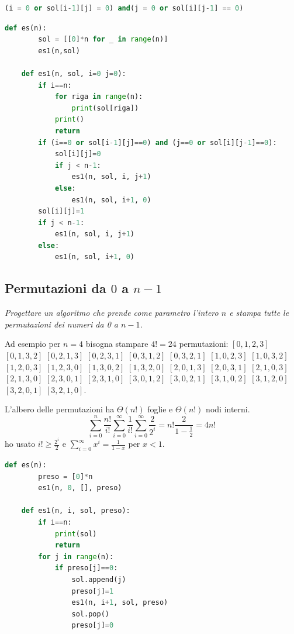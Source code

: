 \begin{lstlisting}[language=Python]
    (i = 0 or sol[i-1][j] = 0) and(j = 0 or sol[i][j-1] == 0)    
\end{lstlisting}

\begin{lstlisting}[language=Python]
    def es(n): 
        sol = [[0]*n for _ in range(n)]
        es1(n,sol)

    def es1(n, sol, i=0 j=0):
        if i==n:
            for riga in range(n):
                print(sol[riga])
            print() 
            return 
        if (i==0 or sol[i-1][j]==0) and (j==0 or sol[i][j-1]==0):
            sol[i][j]=0
            if j < n-1:
                es1(n, sol, i, j+1)
            else: 
                es1(n, sol, i+1, 0) 
        sol[i][j]=1 
        if j < n-1:
            es1(n, sol, i, j+1)
        else:
            es1(n, sol, i+1, 0)
\end{lstlisting}

\subsection{Permutazioni da $0$ a $n-1$}
\textit{Progettare un algoritmo che prende come parametro l'intero $n$ e stampa tutte le permutazioni dei numeri da 0 a $n-1$.}

Ad esempio per $n = 4$ bisogna stampare $4! = 24$ permutazioni: $[0,1,2,3]$ $[0,1,3,2]$ $[0,2,1,3]$ $[0,2,3,1]$ $[0,3,1,2]$ $[0,3,2,1]$ $[1,0,2,3]$ $[1,0,3,2]$ $[1,2,0,3]$ $[1,2,3,0]$ $[1,3,0,2]$ $[1,3,2,0]$ $[2,0,1,3]$ $[2,0,3,1]$ $[2,1,0,3]$ $[2,1,3,0]$ $[2,3,0,1]$ $[2,3,1,0]$ $[3,0,1,2]$ $[3,0,2,1]$ $[3,1,0,2]$ $[3,1,2,0]$ $[3,2,0,1]$ $[3,2,1,0]$.

L’albero delle permutazioni ha $\Theta(n!)$ foglie e $\Theta(n!)$ nodi interni.
\begin{equation*}
    \sum^n_{i=0}\frac{n!}{i!}\sum^\infty_{i=0}\frac{1}{i!}\sum^\infty_{i=0}\frac{2}{2^i}=n!\frac{2}{1-\frac{1}{2}}=4n!
\end{equation*}
ho usato $i!\geq\frac{2^i}{2}$ e $\sum^\infty_{i=0}x^i=\frac{1}{1-x}$ per $x<1$.

\begin{lstlisting}[language=Python]
    def es(n):
        preso = [0]*n
        es1(n, 0, [], preso)

    def es1(n, i, sol, preso):
        if i==n:
            print(sol)
            return 
        for j in range(n):
            if preso[j]==0:
                sol.append(j)
                preso[j]=1
                es1(n, i+1, sol, preso)
                sol.pop()
                preso[j]=0
\end{lstlisting}


